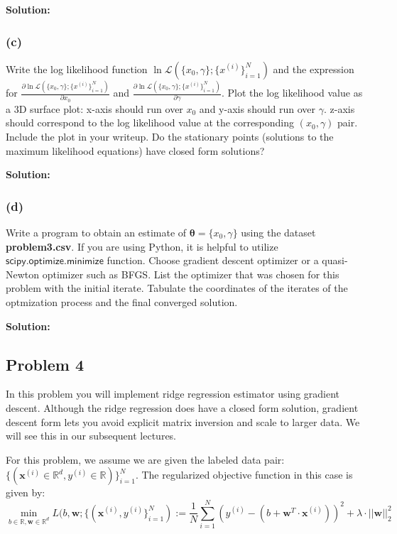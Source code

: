 \documentclass[11pt]{article}
\begin{document}
	{\noindent \bf Solution: }
	
	\vfill
	
	\subsubsection*{(c)}
	Write the log likelihood function $\ln \mathcal{L}(\{x_0, \gamma\}; \{x^{(i)}\}_{i = 1}^N)$ and
	the expression for 
	$\frac{\partial \ln \mathcal{L}( \{x_0, \gamma\}; \{x^{(i)}\}_{i = 1}^N)}
	{\partial x_0}$ and $\frac{\partial 
		\ln \mathcal{L}(\{x_0, \gamma\}; \{x^{(i)}\}_{i = 1}^N)}
	{\partial \gamma}$.
	Plot the log likelihood value as a 3D surface plot: x-axis should run over $x_0$ and
	y-axis should run over $\gamma$. z-axis should correspond to the log likelihood value at
	the corresponding $(x_0, \gamma)$ pair. Include the plot in your writeup.
	 Do the stationary points (solutions to the maximum likelihood equations) have closed form solutions?
	 
	 {\noindent \bf Solution: }
	 
	 \vfill
	 
\subsubsection*{(d)}
	
	Write a program to obtain an estimate of $\mathbf{\theta} = \{ x_0, \gamma \}$ using the dataset {\bf \mbox{problem3.csv}}.
	If you are using Python, it is helpful to utilize $\mathsf{scipy.optimize.minimize}$ 
	function. Choose gradient descent optimizer or a quasi-Newton optimizer such as BFGS.
	List the optimizer that was chosen for this problem with the initial iterate.
	Tabulate the coordinates of the iterates of the optmization process and the final converged solution.

{\noindent \bf Solution: }

\vfill

\clearpage

\subsection*{Problem 4}
In this problem you will implement ridge regression estimator using gradient descent.
Although the ridge regression does have a closed form solution, gradient descent
form lets you avoid explicit matrix inversion and scale to larger data. We will see
this in our subsequent lectures.

For this problem, we assume we are given the labeled data pair:\\
$ \{( \mathbf{x}^{(i)} \in \mathbb{R}^d, y^{(i)} \in \mathbb{R}) \}_{i= 1}^{N}$.
The regularized objective function in this case is given by:
$$\min\limits_{b\in \mathbb{R},\mathbf{w} \in \mathbb{R}^d} L(
b, \mathbf{w}; \{( \mathbf{x}^{(i)}, y^{(i)}  \}_{i= 1}^{N}
) 
:=
\frac{1}{N} \sum\limits_{i = 1}^N (y^{(i)} - ( b + \mathbf{w}^T \cdot 
\mathbf{x}^{(i)}))^2 + \lambda \cdot || \mathbf{w}||_2^2
$$
\end{document}
